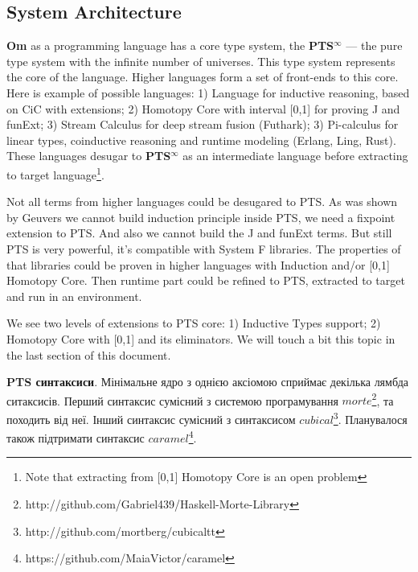 \subsection{System Architecture}
{\bf Om} as a programming language has a core type system, the {\bf PTS$^{\infty}$} --- the pure type system with the infinite number of universes.
This type system represents the core of the language.
Higher languages form a set of front-ends to this core.
 Here is example of possible languages:
1) Language for inductive reasoning, based on CiC with extensions;
2) Homotopy Core with interval [0,1] for proving J and funExt;
3) Stream Calculus for deep stream fusion (Futhark);
3) Pi-calculus for linear types, coinductive reasoning and runtime modeling (Erlang, Ling, Rust).
These languages desugar to {\bf PTS$^{\infty}$} as an intermediate language before extracting to target language\footnote{Note that extracting from [0,1] Homotopy Core is an open problem}.

Not all terms from higher languages could be desugared to PTS.
As was shown by Geuvers\cite{Geuvers01} we cannot build induction principle inside PTS, we need a fixpoint extension to PTS.
And also we cannot build the J and funExt terms.
But still PTS is very powerful, it's compatible with System F libraries.
The properties of that libraries could be proven in higher languages with Induction and/or [0,1] Homotopy Core.
Then runtime part could be refined to PTS, extracted to target and run in an environment.

We see two levels of extensions to PTS core: 1) Inductive Types support; 2) Homotopy Core with [0,1] and its eliminators.
We will touch a bit this topic in the last section of this document.

{\bf PTS синтаксиси}. Мінімальне ядро з однією аксіомою
сприймає декілька лямбда ситаксисів.
Перший синтаксис сумісний з системою програмування
$morte$\footnote{http://github.com/Gabriel439/Haskell-Morte-Library}, та походить від неї.
Інший синтаксис сумісний з синтаксисом $cubical$\footnote{http://github.com/mortberg/cubicaltt}.
Планувалося також підтримати синтаксис $caramel$\footnote{https://github.com/MaiaVictor/caramel}.

